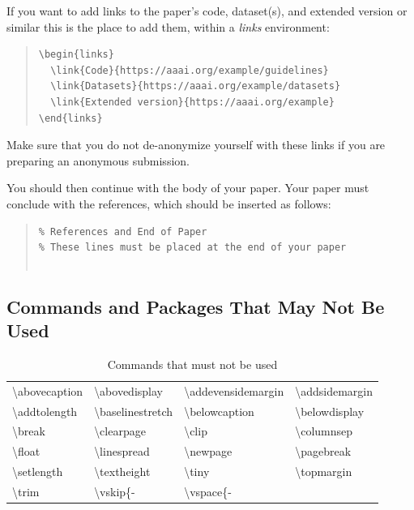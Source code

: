 \noindent If you want to add links to the paper's code, dataset(s), and extended version or similar this is the place to add them, within a \emph{links} environment:
\begin{quote}%
\begin{scriptsize}\begin{verbatim}
\begin{links}
  \link{Code}{https://aaai.org/example/guidelines}
  \link{Datasets}{https://aaai.org/example/datasets}
  \link{Extended version}{https://aaai.org/example}
\end{links}\end{verbatim}\end{scriptsize}
\end{quote}
\noindent Make sure that you do not de-anonymize yourself with these links if you are preparing an anonymous submission.

\noindent You should then continue with the body of your paper. Your paper must conclude with the references, which should be inserted as follows:
\begin{quote}
\begin{scriptsize}\begin{verbatim}
% References and End of Paper
% These lines must be placed at the end of your paper


\end{verbatim}\end{scriptsize}
\end{quote}

\subsection{Commands and Packages That May Not Be Used}
\begin{table}[t]
\centering

\begin{tabular}{llll}
  \toprule
  \textbackslash abovecaption &
  \textbackslash abovedisplay &
  \textbackslash addevensidemargin &
  \textbackslash addsidemargin \\
  \textbackslash addtolength &
  \textbackslash baselinestretch &
  \textbackslash belowcaption &
  \textbackslash belowdisplay \\
  \textbackslash break &
  \textbackslash clearpage &
  \textbackslash clip &
  \textbackslash columnsep \\
  \textbackslash float &
  \textbackslash linespread &
  \textbackslash newpage &
  \textbackslash pagebreak \\
  \textbackslash setlength &
  \textbackslash textheight &
  \textbackslash tiny &
  \textbackslash topmargin \\
  \textbackslash trim &
  \textbackslash vskip\{- &
  \textbackslash vspace\{- \\
  \bottomrule
\end{tabular}
\caption{Commands that must not be used}
\label{table1}
\end{table}

